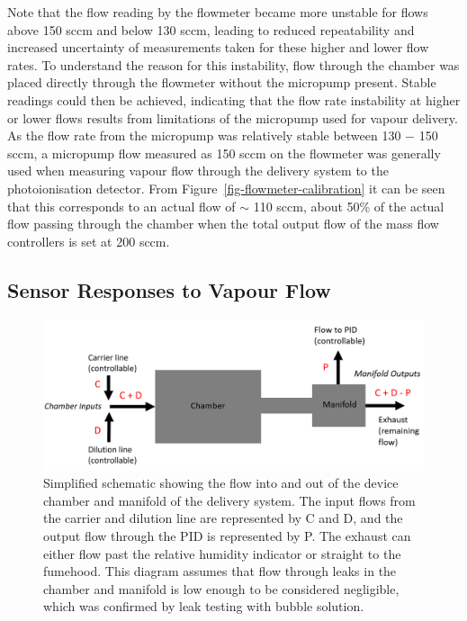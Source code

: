 \documentclass[
  a4paper,
]{scrbook}
\begin{document}
Note that the flow reading by the flowmeter became more unstable for
flows above 150 sccm and below 130 sccm, leading to reduced
repeatability and increased uncertainty of measurements taken for these
higher and lower flow rates. To understand the reason for this
instability, flow through the chamber was placed directly through the
flowmeter without the micropump present. Stable readings could then be
achieved, indicating that the flow rate instability at higher or lower
flows results from limitations of the micropump used for vapour
delivery. As the flow rate from the micropump was relatively stable
between 130 \(-\) 150 sccm, a micropump flow measured as 150 sccm on the
flowmeter was generally used when measuring vapour flow through the
delivery system to the photoionisation detector. From
Figure~\ref{fig-flowmeter-calibration} it can be seen that this
corresponds to an actual flow of \(\sim\) 110 sccm, about 50\% of the
actual flow passing through the chamber when the total output flow of
the mass flow controllers is set at 200 sccm.

\hypertarget{sensor-responses-to-vapour-flow}{%
\subsection{Sensor Responses to Vapour
Flow}\label{sensor-responses-to-vapour-flow}}

\begin{figure}

{\centering \includegraphics[width=1\textwidth,height=\textheight]{figures/ch5/chamber-manifold-v2.png}

}

\caption{\label{fig-chamber-schematic}Simplified schematic showing the
flow into and out of the device chamber and manifold of the delivery
system. The input flows from the carrier and dilution line are
represented by C and D, and the output flow through the PID is
represented by P. The exhaust can either flow past the relative humidity
indicator or straight to the fumehood. This diagram assumes that flow
through leaks in the chamber and manifold is low enough to be considered
negligible, which was confirmed by leak testing with bubble solution.}

\end{figure}
\end{document}
